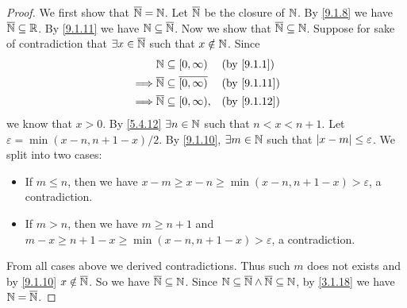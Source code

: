 \begin{proof}
  We first show that \(\overline{\mathbb{N}} = \mathbb{N}\).
  Let \(\overline{\mathbb{N}}\) be the closure of \(\mathbb{N}\).
  By \cref{9.1.8} we have \(\overline{\mathbb{N}} \subseteq \mathbb{R}\).
  By \cref{9.1.11} we have \(\mathbb{N} \subseteq \overline{\mathbb{N}}\).
  Now we show that \(\overline{\mathbb{N}} \subseteq \mathbb{N}\).
  Suppose for sake of contradiction that \(\exists x \in \overline{\mathbb{N}}\) such that \(x \notin \mathbb{N}\).
  Since
  \begin{align*}
             & \N \subseteq [0, \infty)                       &  & \by{9.1.1}  \\
    \implies & \overline{\N} \subseteq \overline{[0, \infty)} &  & \by{9.1.11} \\
    \implies & \overline{\N} \subseteq [0, \infty),           &  & \by{9.1.12}
  \end{align*}
  we know that \(x > 0\).
  By \cref{5.4.12} \(\exists n \in \mathbb{N}\) such that \(n < x < n + 1\).
  Let \(\varepsilon = \min(x - n, n + 1 - x) / 2\).
  By \cref{9.1.10}, \(\exists m \in \mathbb{N}\) such that \(\left\lvert x - m\right\rvert \leq \varepsilon\).
  We split into two cases:
  \begin{itemize}
    \item If \(m \leq n\), then we have \(x - m \geq x - n \geq \min(x - n, n + 1 - x) > \varepsilon\), a contradiction.
    \item If \(m > n\), then we have \(m \geq n + 1\) and \(m - x \geq n + 1 - x \geq \min(x - n, n + 1 - x) > \varepsilon\), a contradiction.
  \end{itemize}
  From all cases above we derived contradictions.
  Thus such \(m\) does not exists and by \cref{9.1.10} \(x \notin \overline{\mathbb{N}}\).
  So we have \(\overline{\mathbb{N}} \subseteq \mathbb{N}\).
  Since \(\mathbb{N} \subseteq \overline{\mathbb{N}} \land \overline{\mathbb{N}} \subseteq \mathbb{N}\), by \cref{3.1.18} we have \(\mathbb{N} = \overline{\mathbb{N}}\).


\end{proof}
